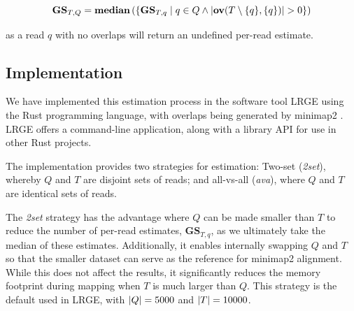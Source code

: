 \documentclass[unnumsec,webpdf,modern,large]{oup-authoring-template}
\theoremstyle{thmstyleone}%
\theoremstyle{thmstyletwo}%
\theoremstyle{thmstylethree}%
\newcommand{\overl}[2]{\mathbf{ov}(#1, #2)}
\newcommand{\overbar}[1]{\mkern 1.5mu\overline{\mkern-1.5mu#1\mkern-1.5mu}\mkern 1.5mu}
\DeclarePairedDelimiter\size{\lvert}{\rvert}
\newcommand{\avglen}[1]{\mathbf{\overbar{\text{$#1$}}}}
\newcommand{\gs}{\textbf{GS}}
\newcommand{\ot}{\textbf{OT}}
\newcommand{\lrge}{LRGE}
\newcommand{\ava}{\textit{ava}}
\newcommand{\twoset}{\textit{2set}}
\begin{document}
\begin{equation}
    \gs_{T,Q} = \textbf{\text{median}}\left( \{ \gs_{T, q} \mid q \in Q  \wedge \size{\overl{T \setminus \{q\}}{\{q\}}} >0   \} \right)
\end{equation}


as a read $q$ with no overlaps will return an undefined per-read estimate.




\subsection{Implementation}

We have implemented this estimation process in the software tool \lrge{} using the Rust programming language, with overlaps being generated by minimap2 \citep{li_minimap2_2018}. \lrge{} offers a command-line application, along with a library API for use in other Rust projects.

The implementation provides two strategies for estimation: Two-set (\twoset{}), whereby $Q$ and $T$ are disjoint sets of reads; and all-vs-all (\ava{}), where $Q$ and $T$ are identical sets of reads.

The \twoset{} strategy has the advantage where $Q$ can be made smaller than $T$ to reduce the number of per-read estimates, $\gs_{T,q}$, as we ultimately take the median of these estimates. Additionally, it enables internally swapping $Q$ and $T$ so that the smaller dataset can serve as the reference for minimap2 alignment. While this does not affect the results, it significantly reduces the memory footprint during mapping when $T$ is much larger than $Q$. This strategy is the default used in \lrge{}, with $\size{Q} = 5000$ and $\size{T} = 10000$.
\end{document}
